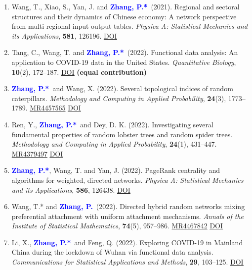 \documentclass[12pt]{article}
\def\MR#1{\href{http://www.ams.org/mathscinet-getitem?mr=#1}{MR#1}}
\newcommand{\PZ}{\textbf{\textcolor{blue}{Zhang, P.*}}}
\newcommand{\PZnot}{\textbf{\textcolor{blue}{Zhang, P.}}}
\begin{document}
\begin{enumerate}
		\item {\sc Wang, T., Xiao, S., Yan, J.} and \PZ\ 
		(2021). Regional and sectoral structures and their dynamics of Chinese economy: A network perspective from
		multi-regional input-output tables. {\em Physica A: Statistical Mechanics and its Applications}, {\bf 581}, 126196.	\href{https://doi.org/10.1016/j.physa.2021.126196}
		{\underline{DOI}}
		
		\item {\sc Tang, C., Wang, T.} and \PZ\ (2022). 
		Functional data analysis: An application to COVID-19 data in
		the United States. {\em Quantitative Biology}, {\bf 10}(2), 
		172--187. \href{https://doi.org/10.15302/J-QB-022-0300}
		{\underline{DOI}} {\bf (equal contribution)}
		
		\item \PZ\ and {\sc Wang, X.} (2022). Several 
		topological indices of random caterpillars. 
		{\em Methodology and Computing in Applied Probability}, {\bf 24}(3), 1773--1789. \MR{4457565} 
		\href{https://doi.org/10.1007/s11009-021-09895-1}
		{\underline{DOI}} 
		
		\item {\sc Ren, Y.}, \PZ\ and {\sc Dey, D. K.} (2022). 
		Investigating several fundamental properties of random 
		lobster trees and random spider trees. {\em Methodology and 
		Computing in Applied Probability}, {\bf 24}(1), 431--447. 
		\MR{4379497} \href{https://doi.org/10.1007/s11009-021-09863-9}
		{\underline{DOI}}
		
		\item \PZ, {\sc Wang, T.} and {\sc Yan, J.} (2022). PageRank centrality and algorithms for weighted, directed networks. {\em Physica A: Statistical Mechanics and its Applications}, {\bf 586}, 126438. 
		\href{https://doi.org/10.1016/j.physa.2021.126438}
		{\underline{DOI}}
		
		\item {\sc Wang, T.*} and \PZnot\ (2022). Directed 
		hybrid random networks mixing preferential attachment with 
		uniform attachment mechanisms. {\em Annals of the Institute of Statistical Mathematics}, {\bf 74}(5), 957--986. \MR{4467842}
		\href{https://doi.org/10.1007/s10463-022-00827-5}
		{\underline{DOI}}
		
		\item {\sc Li, X.}, \PZ\ and {\sc Feng, Q.} (2022). Exploring COVID-19 in Mainland China during the lockdown of Wuhan via functional data analysis. {\em Communications for Statistical Applications and Methods}, {\bf 29}, 103--125. 
		\href{https://doi.org/10.29220/CSAM.2022.29.1.103}
		{\underline{DOI}}
		

\end{enumerate}
\end{document}
